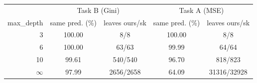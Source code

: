 \begin{tabular}{@{}rcccc@{}}
\toprule
 & \multicolumn{2}{c}{Task B (Gini)} & \multicolumn{2}{c}{Task A (MSE)} \\
max\_depth & same pred. (\%) & leaves ours/sk & same pred. (\%) & leaves ours/sk \\
\midrule
3 & 100.00 & 8/8 & 100.00 & 8/8 \\
6 & 100.00 & 63/63 & 99.99 & 64/64 \\
10 & 99.61 & 540/540 & 96.70 & 818/823 \\
$\infty$ & 97.99 & 2656/2658 & 64.09 & 31316/32928 \\
\bottomrule
\end{tabular}
